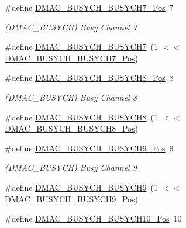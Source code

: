 \begin{DoxyCompactItemize}
\item 
\#define \mbox{\hyperlink{group___s_a_m_d21___d_m_a_c_ga2132afbe7bd19ce963c029ace062297b}{D\+M\+A\+C\+\_\+\+B\+U\+S\+Y\+C\+H\+\_\+\+B\+U\+S\+Y\+C\+H7\+\_\+\+Pos}}~7
\begin{DoxyCompactList}\small\item\em (D\+M\+A\+C\+\_\+\+B\+U\+S\+Y\+CH) Busy Channel 7 \end{DoxyCompactList}\item 
\#define \mbox{\hyperlink{group___s_a_m_d21___d_m_a_c_gaecdf84d88da3aba3f5533f57af2ae7c0}{D\+M\+A\+C\+\_\+\+B\+U\+S\+Y\+C\+H\+\_\+\+B\+U\+S\+Y\+C\+H7}}~(1 $<$$<$ \mbox{\hyperlink{group___s_a_m_d21___d_m_a_c_ga2132afbe7bd19ce963c029ace062297b}{D\+M\+A\+C\+\_\+\+B\+U\+S\+Y\+C\+H\+\_\+\+B\+U\+S\+Y\+C\+H7\+\_\+\+Pos}})
\item 
\#define \mbox{\hyperlink{group___s_a_m_d21___d_m_a_c_ga4721f748c024ab2e5810bd3ddcf22c59}{D\+M\+A\+C\+\_\+\+B\+U\+S\+Y\+C\+H\+\_\+\+B\+U\+S\+Y\+C\+H8\+\_\+\+Pos}}~8
\begin{DoxyCompactList}\small\item\em (D\+M\+A\+C\+\_\+\+B\+U\+S\+Y\+CH) Busy Channel 8 \end{DoxyCompactList}\item 
\#define \mbox{\hyperlink{group___s_a_m_d21___d_m_a_c_gacb3cef5966afc9aaa99c01a1f9add7f7}{D\+M\+A\+C\+\_\+\+B\+U\+S\+Y\+C\+H\+\_\+\+B\+U\+S\+Y\+C\+H8}}~(1 $<$$<$ \mbox{\hyperlink{group___s_a_m_d21___d_m_a_c_ga4721f748c024ab2e5810bd3ddcf22c59}{D\+M\+A\+C\+\_\+\+B\+U\+S\+Y\+C\+H\+\_\+\+B\+U\+S\+Y\+C\+H8\+\_\+\+Pos}})
\item 
\#define \mbox{\hyperlink{group___s_a_m_d21___d_m_a_c_gafa62bfb0cc965c62f93a0bcdea902d82}{D\+M\+A\+C\+\_\+\+B\+U\+S\+Y\+C\+H\+\_\+\+B\+U\+S\+Y\+C\+H9\+\_\+\+Pos}}~9
\begin{DoxyCompactList}\small\item\em (D\+M\+A\+C\+\_\+\+B\+U\+S\+Y\+CH) Busy Channel 9 \end{DoxyCompactList}\item 
\#define \mbox{\hyperlink{group___s_a_m_d21___d_m_a_c_gacd5881c210886405a8126d9898d7440c}{D\+M\+A\+C\+\_\+\+B\+U\+S\+Y\+C\+H\+\_\+\+B\+U\+S\+Y\+C\+H9}}~(1 $<$$<$ \mbox{\hyperlink{group___s_a_m_d21___d_m_a_c_gafa62bfb0cc965c62f93a0bcdea902d82}{D\+M\+A\+C\+\_\+\+B\+U\+S\+Y\+C\+H\+\_\+\+B\+U\+S\+Y\+C\+H9\+\_\+\+Pos}})
\item 
\#define \mbox{\hyperlink{group___s_a_m_d21___d_m_a_c_gadf1410389758eedbf9aa209f271500ea}{D\+M\+A\+C\+\_\+\+B\+U\+S\+Y\+C\+H\+\_\+\+B\+U\+S\+Y\+C\+H10\+\_\+\+Pos}}~10
$$
\end{DoxyCompactItemize}
